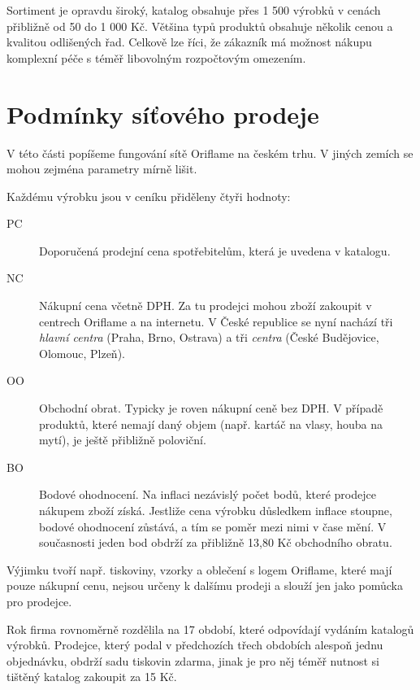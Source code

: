 \documentclass[a4wide,12pt]{report}
\begin{document}
Sortiment je opravdu široký, katalog obsahuje přes 1 500 výrobků v cenách přibližně od 50 do 1 000 Kč. Většina typů produktů obsahuje několik cenou a kvalitou odlišených řad. Celkově lze říci, že zákazník má možnost nákupu komplexní péče s téměř libovolným rozpočtovým omezením.
\section{Podmínky síťového prodeje}
V této části popíšeme fungování sítě Oriflame na českém trhu. V jiných zemích se mohou zejména parametry mírně lišit.

Každému výrobku jsou v ceníku přiděleny čtyři hodnoty:
\begin{description}
\item[PC] Doporučená prodejní cena spotřebitelům, která je uvedena v katalogu.
\item[NC] Nákupní cena včetně DPH. Za tu prodejci mohou zboží zakoupit v centrech Oriflame a na internetu. V České republice se nyní nachází tři \emph{hlavní centra} (Praha, Brno, Ostrava) a tři \emph{centra} (České Budějovice, Olomouc, Plzeň).
\item[OO] Obchodní obrat. Typicky je roven nákupní ceně bez DPH. V případě produktů, které nemají daný objem (např. kartáč na vlasy, houba na mytí), je ještě přibližně poloviční.
\item[BO] Bodové ohodnocení. Na inflaci nezávislý počet bodů, které prodejce nákupem zboží získá. Jestliže cena výrobku důsledkem inflace stoupne, bodové ohodnocení zůstává, a tím se poměr mezi nimi v čase mění. V současnosti jeden bod obdrží za přibližně 13,80 Kč obchodního obratu.
\end{description}
Výjimku tvoří např. tiskoviny, vzorky a oblečení s logem Oriflame, které mají pouze nákupní cenu,  nejsou určeny k dalšímu prodeji a slouží jen jako pomůcka pro prodejce.

Rok firma rovnoměrně rozdělila na 17 období, které odpovídají vydáním katalogů výrobků. Prodejce, který podal v předchozích třech obdobích alespoň jednu objednávku, obdrží sadu tiskovin zdarma, jinak je pro něj téměř nutnost si tištěný katalog zakoupit za 15 Kč.
\end{document}
